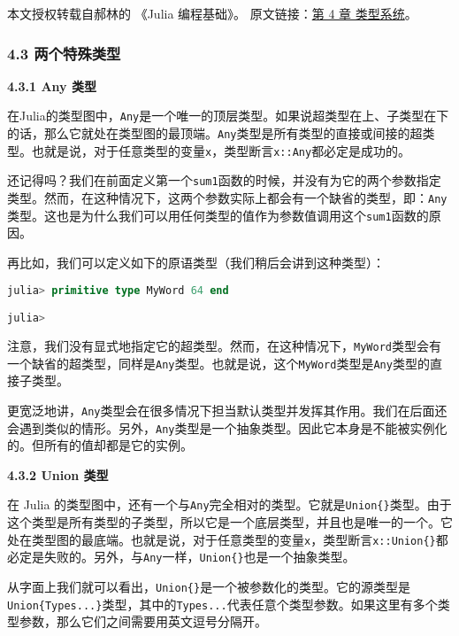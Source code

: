 
本文授权转载自郝林的 《Julia 编程基础》。 原文链接：\href{https://github.com/hyper0x/JuliaBasics/blob/master/book/ch04.md}{第 4 章 类型系统}。


\subsubsection{4.3 两个特殊类型}

\textbf{4.3.1 Any 类型}

在Julia的类型图中，\verb|Any|是一个唯一的顶层类型。如果说超类型在上、子类型在下的话，那么它就处在类型图的最顶端。\verb|Any|类型是所有类型的直接或间接的超类型。也就是说，对于任意类型的变量\verb|x|，类型断言\verb|x::Any|都必定是成功的。

还记得吗？我们在前面定义第一个\verb|sum1|函数的时候，并没有为它的两个参数指定类型。然而，在这种情况下，这两个参数实际上都会有一个缺省的类型，即：\verb|Any|类型。这也是为什么我们可以用任何类型的值作为参数值调用这个\verb|sum1|函数的原因。

再比如，我们可以定义如下的原语类型（我们稍后会讲到这种类型）：

\begin{lstlisting}[language=julia]
julia> primitive type MyWord 64 end

julia> 
\end{lstlisting}

注意，我们没有显式地指定它的超类型。然而，在这种情况下，\verb|MyWord|类型会有一个缺省的超类型，同样是\verb|Any|类型。也就是说，这个\verb|MyWord|类型是\verb|Any|类型的直接子类型。

更宽泛地讲，\verb|Any|类型会在很多情况下担当默认类型并发挥其作用。我们在后面还会遇到类似的情形。另外，\verb|Any|类型是一个抽象类型。因此它本身是不能被实例化的。但所有的值却都是它的实例。

\textbf{4.3.2 Union{} 类型}

在 Julia 的类型图中，还有一个与\verb|Any|完全相对的类型。它就是\verb|Union{}|类型。由于这个类型是所有类型的子类型，所以它是一个底层类型，并且也是唯一的一个。它处在类型图的最底端。也就是说，对于任意类型的变量\verb|x|，类型断言\verb|x::Union{}|都必定是失败的。另外，与\verb|Any|一样，\verb|Union{}|也是一个抽象类型。

从字面上我们就可以看出，\verb|Union{}|是一个被参数化的类型。它的源类型是\verb|Union{Types...}|类型，其中的\verb|Types...|代表任意个类型参数。如果这里有多个类型参数，那么它们之间需要用英文逗号分隔开。


